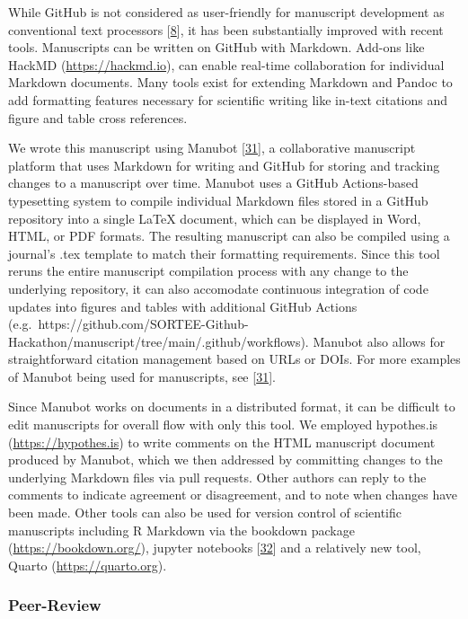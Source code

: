 While GitHub is not considered as user-friendly for manuscript development as conventional text processors {[}\protect\hyperlink{ref-4ny1onB0}{8}{]}, it has been substantially improved with recent tools.
Manuscripts can be written on GitHub with Markdown.
Add-ons like HackMD (\url{https://hackmd.io}), can enable real-time collaboration for individual Markdown documents.
Many tools exist for extending Markdown and Pandoc to add formatting features necessary for scientific writing like in-text citations and figure and table cross references.

We wrote this manuscript using Manubot {[}\protect\hyperlink{ref-YuJbg3zO}{31}{]}, a collaborative manuscript platform that uses Markdown for writing and GitHub for storing and tracking changes to a manuscript over time.
Manubot uses a GitHub Actions-based typesetting system to compile individual Markdown files stored in a GitHub repository into a single LaTeX document, which can be displayed in Word, HTML, or PDF formats.
The resulting manuscript can also be compiled using a journal's .tex template to match their formatting requirements.
Since this tool reruns the entire manuscript compilation process with any change to the underlying repository, it can also accomodate continuous integration of code updates into figures and tables with additional GitHub Actions (e.g.~https://github.com/SORTEE-Github-Hackathon/manuscript/tree/main/.github/workflows).
Manubot also allows for straightforward citation management based on URLs or DOIs.
For more examples of Manubot being used for manuscripts, see {[}\protect\hyperlink{ref-YuJbg3zO}{31}{]}.

Since Manubot works on documents in a distributed format, it can be difficult to edit manuscripts for overall flow with only this tool.
We employed hypothes.is (\url{https://hypothes.is}) to write comments on the HTML manuscript document produced by Manubot, which we then addressed by committing changes to the underlying Markdown files via pull requests.
Other authors can reply to the comments to indicate agreement or disagreement, and to note when changes have been made.
Other tools can also be used for version control of scientific manuscripts including R Markdown via the bookdown package (\url{https://bookdown.org/}), jupyter notebooks {[}\protect\hyperlink{ref-i4FOZpjN}{32}{]} and a relatively new tool, Quarto (\url{https://quarto.org}).

\hypertarget{peer-review}{%
\subsubsection{Peer-Review}\label{peer-review}}


